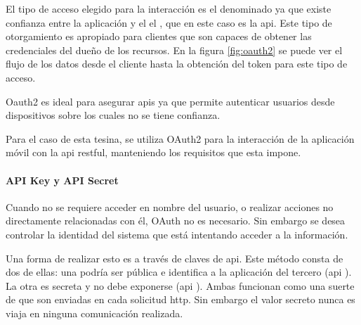 El tipo de acceso elegido para la interacción  es el denominado  ya que existe confianza entre la aplicación y el el , que en este caso es la \gls{api}. Este tipo de otorgamiento es apropiado para clientes que son capaces de obtener las credenciales del dueño de los recursos\cite{hardt2012oauth}.
En la figura \ref{fig:oauth2} se puede ver el flujo de los datos desde el cliente hasta la obtención del token para este tipo de acceso.


Oauth2 es ideal para asegurar \glspl{api} ya que permite autenticar usuarios desde dispositivos sobre los cuales no se tiene confianza\cite{degges2015ApiSecurity}. 

Para el caso de esta tesina, se utiliza OAuth2 para la interacción de la aplicación móvil con la \gls{api} \gls{restful}, manteniendo los requisitos que esta impone.

\paragraph{API Key y API Secret}
\label{apikey}
Cuando no se requiere acceder en nombre del usuario, o realizar acciones no directamente relacionadas con él, OAuth no es necesario. Sin embargo se desea controlar la identidad del sistema que está intentando acceder a la información. 

Una forma de realizar esto es a través de claves de \gls{api}. Este método consta de dos de ellas: una podría ser pública e identifica a la aplicación del tercero (\gls{api} ). La otra es secreta y no debe exponerse (\gls{api} ). Ambas funcionan como una suerte de  que son enviadas en cada solicitud \gls{http}. Sin embargo el valor secreto nunca es viaja en ninguna comunicación realizada.

